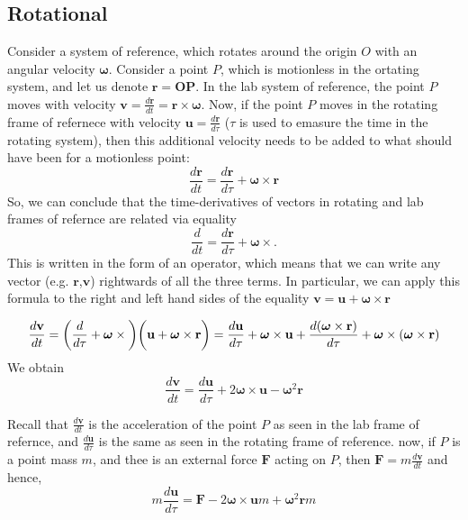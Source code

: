\documentclass[12pt,a4paper]{extreport}
\numberwithin{equation}{chapter}
\renewcommand{\vec}[1]{\mathbf{#1}}
\begin{document}
        \subsection{Rotational}
        Consider a system of reference, which rotates around the origin $O$ with an angular velocity $\boldsymbol{\omega}$. Consider a point $P$, which is motionless in the ortating system, and let us denote $\vec{r}=\vec{OP}$. 
        In the lab system of reference, the point $P$ moves with velocity $\mathbf{v}=\frac{d\mathbf{r}}{dt}=\mathbf{r} \times \boldsymbol{\omega}$. Now, if the point $P$ moves in the rotating frame of refernece with velocity $\mathbf{u}=\frac{d\mathbf{r}}{d\tau}$ ($\tau$ is used to emasure the time in the rotating system), then this additional velocity needs to be added to what should have been for a motionless point: 
        $$\frac{d\mathbf{r}}{dt}=\frac{d\mathbf{r}}{d\tau}+\boldsymbol{\omega}\times \mathbf{r}$$
        So, we can conclude that the time-derivatives of vectors in rotating and lab frames of refernce are related via equality
        $$\frac{d}{dt}=\frac{d\mathbf{r}}{d\tau}+\boldsymbol{\omega}\times . $$
        This is written in the form of an operator, which means that we can write any vector (e.g. $\mathbf{r}$,$\mathbf{v}$) rightwards of all the three terms. In particular, we can apply this formula to the right and left hand sides of the equality $\mathbf{v}=\mathbf{u}+\boldsymbol{\omega} \times \mathbf{r}$

        $$\frac{d\mathbf{v}}{dt}=\bigg(\frac{d}{d\tau}+\boldsymbol{\omega}\times\bigg)\bigg(\mathbf{u}+\boldsymbol{\omega}\times\mathbf{r}\bigg)
        \\
        = \frac{d\mathbf{u}}{d\tau}+\boldsymbol{\omega}\times\mathbf{u}+\frac{d(\boldsymbol{\omega}\times \mathbf{r})}{d\tau}+\boldsymbol{\omega}\times(\boldsymbol{\omega}\times \mathbf{r})$$
        We obtain
        $$\frac{d\mathbf{v}}{dt}=\frac{d\mathbf{u}}{d\tau}+2\boldsymbol{\omega}\times\mathbf{u}-\boldsymbol{\omega}^2\mathbf{r}$$

        Recall that $\frac{d\mathbf{v}}{dt}$ is the acceleration of the point $P$ as seen in the lab frame of refernce, and $\frac{d\mathbf{u}}{d\tau}$ is the same as seen in the rotating frame of reference. now, if $P$ is a point mass $m$, and thee is an external force $\mathbf{F}$ acting on $P$, then $\mathbf{F}=m\frac{d\mathbf{v}}{dt}$ and hence,
        $$m\frac{d\mathbf{u}}{d\tau}=\mathbf{F}-2\boldsymbol{\omega}\times\mathbf{u}m+\boldsymbol{\omega}^2\mathbf{r}m$$
\end{document}
